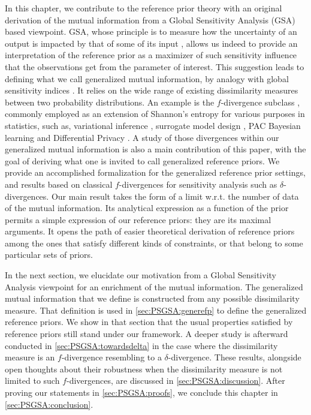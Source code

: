 In this chapter, we contribute to the reference prior theory with an original derivation of the mutual information from a Global Sensitivity Analysis (GSA) based viewpoint. %
GSA, whose principle is to measure how the uncertainty of an output is impacted by that of some of its input \citep{iooss_review_2015}, allows us indeed to provide %
an interpretation of the reference prior as a maximizer of such sensitivity influence that the observations get from the parameter of interest. 
This suggestion leads to defining what we call generalized mutual information, by analogy with global sensitivity indices \citep{da_veiga_basics_2021}. %
It relies on the wide range of existing dissimilarity measures between two probability distributions.
An example is the $f$-divergence subclass \citep{csiszar_information-type_1967}, commonly employed as an extension of  Shannon's entropy for various purposes in statistics, such as, variational inference \citep{minka_divergence_2005,bach_sum--squares_2023}, surrogate model design \citep{nguyen_surrogate_2009}, PAC Bayesian learning \citep{picard-weibel_change_2022} and Differential Privacy \citep{mironov_renyi_2017}.
%
A study of those divergences within our generalized mutual information is {also} a main contribution of this paper, with the goal of deriving what one is invited to call generalized reference priors.
We provide an accomplished formalization for the generalized reference prior settings, and results based on classical $f$-divergences for sensitivity analysis such as $\delta$-divergences.
{
Our main result takes the form of a limit w.r.t. the number of data of the mutual information. Its analytical expression as a function of the prior permits a simple expression of our reference priors: they are its maximal arguments. It opens the path of easier {theoretical} derivation of reference priors among the ones that satisfy different kinds of constraints, or that belong to some particular sets of priors.}


In the next section, %
we elucidate our motivation 
from a Global Sensitivity Analysis viewpoint for an enrichment of the mutual information. 
The generalized mutual information that we define is constructed from any possible dissimilarity measure.
That definition is used in \cref{sec:PSGSA:generefp} to define the generalized reference priors. We show in that section that the usual properties satisfied by reference priors still stand under our framework.
A deeper study is afterward conducted in \cref{sec:PSGSA:towardsdelta} in the case where the dissimilarity measure is an $f$-divergence resembling to a $\delta$-divergence. 
These results, alongside open thoughts about their robustness when the dissimilarity measure is not limited to such $f$-divergences, are discussed in \cref{sec:PSGSA:discussion}.
After proving our statements in \cref{sec:PSGSA:proofs}, we conclude this chapter in \cref{sec:PSGSA:conclusion}.







